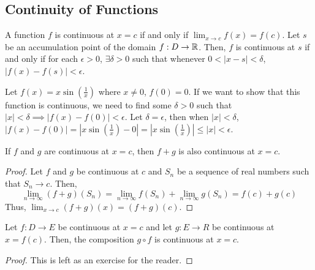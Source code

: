 \subsection{Continuity of Functions}
\begin{definition}
    A function $f$ is continuous at $x = c$ if and only if $\lim_{x \to c} f(x) = f(c)$. Let $s$ be an accumulation point of the domain $f:D \to \mathbb{R}$. Then, $f$ is continuous at $s$ if and only if for each $\epsilon > 0$, $\exists \delta > 0$ such that whenever $0 < |x - s| < \delta$, $|f(x) - f(s)| < \epsilon$.
\end{definition}
\begin{remark}
    Let $f(x) = x\sin(\frac{1}{x})$ where $x \neq 0$, $f(0) = 0$. If we want to show that this function is continuous, we need to find some $\delta > 0$ such that $|x| < \delta \implies |f(x) - f(0)| < \epsilon$. Let $\delta = \epsilon$, then when $|x| < \delta$, $|f(x) - f(0)| = |x\sin(\frac{1}{x}) - 0| = |x\sin(\frac{1}{x})| \leq |x| < \epsilon$.
\end{remark}

\begin{theorem}
    If $f$ and $g$ are continuous at $x = c$, then $f + g$ is also continuous at $x = c$.
\end{theorem}
\begin{proof}
    Let $f$ and $g$ be continuous at $c$ and $S_n$ be a sequence of real numbers such that $S_n \to c$. Then, $$\lim_{n \to \infty} (f + g)(S_n) = \lim_{n \to \infty} f(S_n) + \lim_{n \to \infty} g(S_n) = f(c) + g(c)$$ Thus, $\lim_{x \to c} (f + g)(x) = (f + g)(c)$.
\end{proof}

\begin{theorem}
    Let $f:D \to E$ be continuous at $x = c$ and let $g:E \to R$ be continuous at $x = f(c)$. Then, the composition $g \circ f$ is continuous at $x = c$.
\end{theorem}
\begin{proof}
    This is left as an exercise for the reader.
\end{proof}